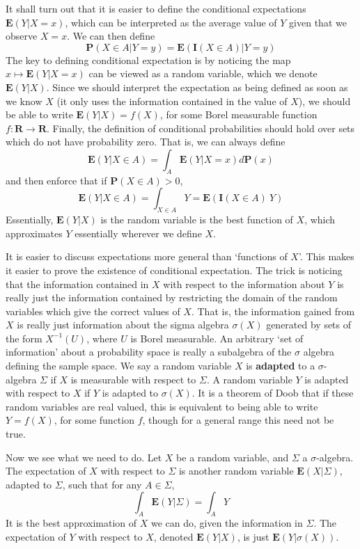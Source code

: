It shall turn out that it is easier to define the conditional expectations $\mathbf{E}(Y | X = x)$, which can be interpreted as the average value of $Y$ given that we observe $X = x$. We can then define
%
\[ \mathbf{P}(X \in A | Y = y) = \mathbf{E}(\mathbf{I}(X \in A) | Y = y) \]
%
The key to defining conditional expectation is by noticing the map $x \mapsto \mathbf{E}(Y | X = x)$ can be viewed as a random variable, which we denote $\mathbf{E}(Y|X)$. Since we should interpret the expectation as being defined as soon as we know $X$ (it only uses the information contained in the value of $X$), we should be able to write $\mathbf{E}(Y|X) = f(X)$, for some Borel measurable function $f: \mathbf{R} \to \mathbf{R}$. Finally, the definition of conditional probabilities should hold over sets which do not have probability zero. That is, we can always define
%
\[ \mathbf{E}(Y | X \in A) = \int_A \mathbf{E}(Y | X = x) d \mathbf{P}(x) \]
%
and then enforce that if $\mathbf{P}(X \in A) > 0$,
%
\[ \mathbf{E}(Y | X \in A) = \int_{X \in A} Y = \mathbf{E}(\mathbf{I}(X \in A)\ Y) \]
%
Essentially, $\mathbf{E}(Y|X)$ is the random variable is the best function of $X$, which approximates $Y$ essentially wherever we define $X$.

It is easier to discuss expectations more general than `functions of $X$'. This makes it easier to prove the existence of conditional expectation. The trick is noticing that the information contained in $X$ with respect to the information about $Y$ is really just the information contained by restricting the domain of the random variables which give the correct values of $X$. That is, the information gained from $X$ is really just information about the sigma algebra $\sigma(X)$ generated by sets of the form $X^{-1}(U)$, where $U$ is Borel measurable. An arbitrary `set of information' about a probability space is really a subalgebra of the $\sigma$ algebra defining the sample space. We say a random variable $X$ is {\bf adapted} to a $\sigma$-algebra $\Sigma$ if $X$ is measurable with respect to $\Sigma$. A random variable $Y$ is adapted with respect to $X$ if $Y$ is adapted to $\sigma(X)$. It is a theorem of Doob that if these random variables are real valued, this is equivalent to being able to write $Y = f(X)$, for some function $f$, though for a general range this need not be true.

Now we see what we need to do. Let $X$ be a random variable, and $\Sigma$ a $\sigma$-algebra. The expectation of $X$ with respect to $\Sigma$ is another random variable $\mathbf{E}(X|\Sigma)$, adapted to $\Sigma$, such that for any $A \in \Sigma$,
%
\[ \int_A \mathbf{E}(Y|\Sigma) = \int_A Y \]
%
It is the best approximation of $X$ we can do, given the information in $\Sigma$. The expectation of $Y$ with respect to $X$, denoted $\mathbf{E}(Y|X)$, is just $\mathbf{E}(Y|\sigma(X))$.

